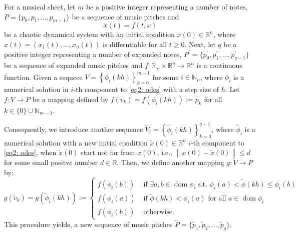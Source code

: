 \documentclass[11pt]{article}
\theoremstyle{definition}
\DeclareMathOperator{\dom}{dom}
\begin{document}
For a musical sheet, let $m$ be a positive integer representing a number of notes, $P = \{p_0, p_1, \dots, p_{m-1}\}$ be a sequence of music pitches and  
\begin{equation} \label{eq2: odes}
\dot{x}(t) = f(t,x)
\end{equation}
be a chaotic dynamical system with an initial condition $x(0) \in \mathbb{R}^n$, where $x(t) = \left(x_1(t), \ldots, x_n(t)\right)$ is differntiable for all $t \geq 0$.
Next, let $q$ be a positive integer representing a number of expanded notes, $P^\prime = \{p^\prime_0, p^\prime_1, \dots, p^\prime_{q-1}\}$ be a sequence of expanded music pitches and $f: \mathbb{R}_{+} \times \mathbb{R}^n \to \mathbb{R}^n$ is a continuous function. 
Given a sequece
$ V = \displaystyle\left\{\phi_i(kh) \right\}_{k=0}^{m-1}$ 
for some $i \in \mathbb{N}_n$, where $\phi_i$ is a numerical solution in $i$-th component to \eqref{eq2: odes} with a step size of $h$.
Let $ f: V \to P$ be a mapping defined by 
$f(v_k) = f(\phi_i(kh)) := p_k$ for all $k \in \{0\}\cup\mathbb{N}_{m-1}$.

Consequently, we introduce another sequence $\widetilde{V}_i = \left\{\tilde{\phi}_i(kh) \right\}_{k=0}^{q-1}$, where $\tilde{\phi}_i$ is a numerical solution with a new initial condition $\tilde{x}(0) \in \mathbb{R}^n$ $i$-th component to \eqref{eq2: odes}, 
when $\tilde{x}(0)$ start not far from $x(0)$, i.e., $ \left\lVert x(0) - \tilde{x}(0) \right\rVert \leq d$ for some small positve number $d \in \mathbb{R}$. Then, we define another mapping $g: \widetilde{V} \to P$ by: 
\[ g(\tilde{v}_k) = g\left(\tilde{\phi}_i(kh)\right) := 
\begin{cases}
  f(\phi_i(b)) & \text{ if }\exists a, b \in \dom{\phi_i} \text{ s.t. } \phi_i(a) < \tilde{\phi}(kh) \leq \phi_i(b) \\
  f(\phi_i(a)) & \text{ if } \tilde{\phi}(kh) < \phi_i(a) \text{ for all } a \in \dom{\phi_i} \\
  f(\phi_i(b)) & \text{ otherwise} .
\end{cases}
\]
This procedure yields, a new sequence of music pitches $\widetilde{P} =\{ \tilde{p}_1, \tilde{p}_2, \dots, \tilde{p}_q \}$.
\end{document}
